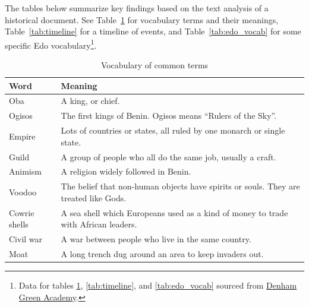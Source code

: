 The tables below summarize key findings based on the text analysis of a historical document. See Table~\ref{tab:vocabulary} for vocabulary terms and their meanings, Table~\ref{tab:timeline} for a timeline of events, and Table~\ref{tab:edo_vocab} for some specific Edo vocabulary\footnote{Data for tables \ref{tab:vocabulary}, \ref{tab:timeline}, and \ref{tab:edo_vocab} sourced from \href{https://denhamgreenacademy.e-act.org.uk/wp-content/uploads/sites/5/2020/10/RAFBookletYear-5-1Benin-Kingdom-paper-size-297x21-cmUPDATED.210187322-wecompress.com_.pdf}{Denham Green Academy}.}.
\begin{table}[htb]
\centering
\caption{Vocabulary of common terms}
\label{tab:vocabulary}
\begin{tabularx}{\linewidth}{|l|X|}
\hline
\textbf{Word} & \textbf{Meaning} \\
\hline
Oba & A king, or chief. \\
\hline
Ogisos & The first kings of Benin. Ogisos means “Rulers of the Sky”. \\
\hline
Empire & Lots of countries or states, all ruled by one monarch or single state. \\
\hline
Guild & A group of people who all do the same job, usually a craft. \\
\hline
Animism & A religion widely followed in Benin. \\
\hline
Voodoo & The belief that non-human objects have spirits or souls. They are treated like Gods. \\
\hline
Cowrie shells & A sea shell which Europeans used as a kind of money to trade with African leaders. \\
\hline
Civil war & A war between people who live in the same country. \\
\hline
Moat & A long trench dug around an area to keep invaders out. \\
\hline
\end{tabularx}
\end{table}

